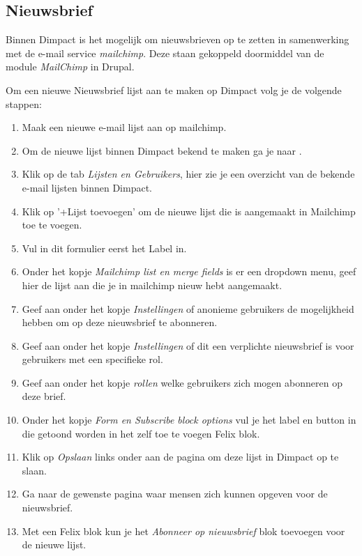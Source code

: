 \subsection{Nieuwsbrief}\label{nieuwsbrief}

Binnen Dimpact is het mogelijk om nieuwsbrieven op te zetten in samenwerking met de e-mail service \emph{mailchimp}. Deze staan gekoppeld doormiddel van de module \emph{MailChimp} in Drupal.

Om een nieuwe Nieuwsbrief lijst aan te maken op Dimpact volg je de volgende stappen:
\begin{enumerate}
  \item Maak een nieuwe e-mail lijst aan op mailchimp. 
  \item Om de nieuwe lijst binnen Dimpact bekend te maken ga je naar .
  \item Klik op de tab \emph{Lijsten en Gebruikers}, hier zie je een overzicht van de bekende e-mail lijsten binnen Dimpact.
  \item Klik op '+Lijst toevoegen' om de nieuwe lijst die is aangemaakt in Mailchimp toe te voegen.
  \item Vul in dit formulier eerst het Label in.
  \item Onder het kopje \emph{Mailchimp list en merge fields} is er een dropdown menu, geef hier de lijst aan die je in mailchimp nieuw hebt aangemaakt.
  \item Geef aan onder het kopje \emph{Instellingen} of anonieme gebruikers de mogelijkheid hebben om op deze nieuwsbrief te abonneren.
  \item Geef aan onder het kopje \emph{Instellingen} of dit een verplichte nieuwsbrief is voor gebruikers met een specifieke rol.
  \item Geef aan onder het kopje \emph{rollen} welke gebruikers zich mogen abonneren op deze brief.
  \item Onder het kopje \emph{Form en Subscribe block options} vul je het label en button in die getoond worden in het zelf toe te voegen Felix blok. 
  \item Klik op \emph{Opslaan} links onder aan de pagina om deze lijst in Dimpact op te slaan.
  \item Ga naar de gewenste pagina waar mensen zich kunnen opgeven voor de nieuwsbrief.
  \item Met een Felix blok kun je het \emph{Abonneer op nieuwsbrief} blok toevoegen voor de nieuwe lijst.
\end{enumerate}
